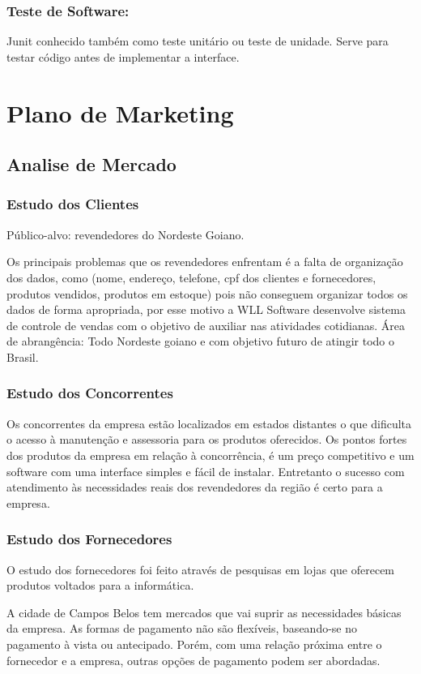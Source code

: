 \documentclass[chapter=TITLE,12pt,oneside,a4paper,english,french,sumario=tradicional,spanish,brazil,]{abntex2}
\begin{document}
\subsection{Teste de Software:}
Junit conhecido também como teste unitário ou teste de unidade. Serve para testar código antes de implementar a interface.


\chapter{Plano de Marketing}
\section{Analise de Mercado}
\subsection{Estudo dos Clientes}
Público-alvo: revendedores do Nordeste Goiano.

Os principais problemas que os revendedores enfrentam é a falta de organização dos dados, como (nome, endereço, telefone, cpf dos clientes e fornecedores, produtos vendidos, produtos em estoque) pois não conseguem organizar todos os dados de forma apropriada, por esse motivo a WLL Software desenvolve sistema de controle de vendas com o objetivo de auxiliar nas atividades cotidianas.
Área de abrangência: Todo Nordeste goiano e com objetivo futuro de atingir todo o
Brasil.


\subsection{Estudo dos Concorrentes}
Os concorrentes da empresa estão localizados em estados distantes o que dificulta o acesso à manutenção e assessoria para os produtos oferecidos. Os pontos fortes dos produtos da empresa em relação à concorrência, é um preço competitivo e um software com uma interface simples e fácil de instalar. Entretanto o sucesso com atendimento às necessidades reais dos revendedores da região é certo para a empresa.

\subsection{Estudo dos Fornecedores}
O estudo dos fornecedores foi feito através de pesquisas em lojas que oferecem produtos voltados para a informática.

A cidade de Campos Belos tem mercados que vai suprir as necessidades básicas da empresa. As formas de pagamento não são flexíveis, baseando-se no pagamento à vista ou antecipado. Porém, com uma relação próxima entre o fornecedor e a empresa, outras opções de pagamento podem ser abordadas.
\end{document}
